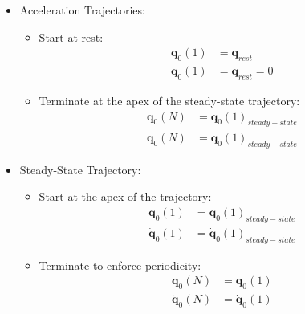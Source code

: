         \begin{itemize}
            \item Acceleration Trajectories:
            \begin{itemize}
                \item Start at rest:
                \begin{equation}
                    \begin{split}
                        \bm{q}_0(1) &= \bm{q}_{rest} \\
                        \dot{\bm{q}}_0(1) &= \dot{\bm{q}}_{rest} = 0
                    \end{split}
                \end{equation}
                \item Terminate at the apex of the steady-state trajectory:
                \begin{equation} \label{eq:terminal_accel}
                    \begin{split}
                        \bm{q}_0(N) &= \bm{q}_0(1)_{steady-state} \\
                        \dot{\bm{q}}_0(N) &= \dot{\bm{q}}_0(1)_{steady-state}
                    \end{split}
                \end{equation}
            \end{itemize}
            
            \item Steady-State Trajectory:
            \begin{itemize}
                \item Start at the apex of the trajectory:
                \begin{equation}
                    \begin{split}
                        \bm{q}_0(1) &= \bm{q}_0(1)_{steady-state} \\
                        \dot{\bm{q}}_0(1) &= \dot{\bm{q}}_0(1)_{steady-state} 
                    \end{split}
                \end{equation}
                \item Terminate to enforce periodicity:
                   \begin{equation} \label{eq:terminal_ss}
                        \begin{split}
                            \bm{q}_0(N) &= \bm{q}_0(1) \\
                            \dot{\bm{q}}_0(N) &= \dot{\bm{q}}_0(1)
                        \end{split}
                    \end{equation}
            \end{itemize}
            

\end{itemize}
